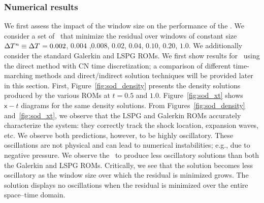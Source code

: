 \subsubsection{Numerical results}
We first assess the impact of the window size on the performance of the \methodAcronymROMs.  We consider a set of \methodAcronymROMs\ that minimize the residual over windows of constant size 
$\Delta T^{n} \equiv \Delta T^{} =  0.002$, $0.004$ ,$0.008$, $0.02$, $0.04$, $0.10$, $0.20$, $1.0$. We additionally consider the standard Galerkin and LSPG ROMs. We first show results for \methodAcronymROMs\ using the direct method with CN time discretization; a comparison of different time-marching methods and direct/indirect solution techniques will be provided later in this section. 
First, Figure~\ref{fig:sod_density} presents the density solutions produced by the various ROMs at $t = 0.5$ and $1.0$. Figure~\ref{fig:sod_xt} shows 
$\mathsf{x}-t$ diagrams for the same density solutions. From Figures~\ref{fig:sod_density} and~\ref{fig:sod_xt}, we observe that the LSPG and Galerkin ROMs accurately characterize 
the system: they correctly track the shock location, expansion waves, etc. We observe both predictions, however, to be highly oscillatory. These oscillations are 
not physical and can lead to numerical instabilities; e.g., due to negative pressure. We observe the \methodAcronymROMs\ to produce less oscillatory solutions than both 
the Galerkin and LSPG ROMs. Critically, we see that the solution becomes less oscillatory as the window size over which the residual is minimized grows. The solution displays no oscillations when the residual is minimized over the entire space--time domain. 

